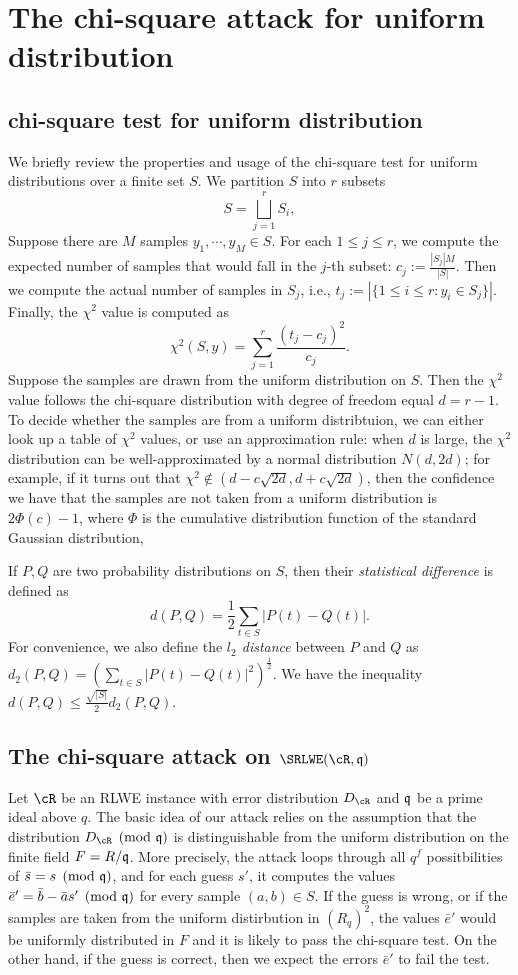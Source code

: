 \documentclass{amsart}
\begin{document}
\section{The chi-square attack for uniform distribution}
\label{sec: chi-square}
\subsection{chi-square test for uniform distribution}
We briefly review the properties and usage of the chi-square test for uniform distributions over a finite set $S$.  We partition $S$ into $r$ subsets
\[
    S = \bigsqcup_{j=1}^r S_i,
\]
Suppose there are $M$ samples $y_1, \cdots, y_M \in S$.
For each $1 \leq j \leq r$, we compute the expected number of samples that would fall in the $j$-th subset: $c_j := \frac{|S_j|M}{|S|}$. Then we compute the actual number of samples in $S_j$, i.e., $t_j := |\{1 \leq i \leq r: y_i \in S_j\}|$. Finally, the $\chi^2$ value is computed as
\[
    \chi^2(S,y) = \sum_{j = 1}^r \frac{(t_j -c_j)^2}{c_j}.
\]
Suppose the samples are drawn from the uniform distribution on $S$. Then the $\chi^2$ value follows the chi-square distribution with degree of freedom equal $d = r-1$.
To decide whether the samples are from a uniform distribtuion, we can either look up a table of $\chi^2$ values, or use an approximation rule:  when $d$ is large, the $\chi^2$ distribution can be well-approximated by a normal distribution $N(d, 2d)$; for example, if it turns out that $\chi^2 \notin (d - c \sqrt{2d}, d+ c \sqrt{2d})$, then the confidence we have that the samples are not taken from a uniform distribution is $2\Phi(c) - 1$, where $\Phi$ is the cumulative distribution function of the standard Gaussian distribution,

If $P,Q$ are two probability distributions on $S$, then their {\it statistical difference} is defined as
\[
    d(P,Q) = \frac{1}{2} \sum_{t \in S} |P(t) - Q(t)|.
\]
For convenience, we also define the {\it $l_2$ distance} between $P$ and $Q$ as $d_2(P,Q) = (\sum_{t \in S} |P(t) - Q(t)|^2)^{\frac{1}{2}}$. We have the inequality $d(P,Q) \leq \frac{\sqrt{|S|}}{2}d_2(P,Q)$.



\subsection{The chi-square attack on $\SRLWE(\cR,\fq)$}

Let $\cR$ be an RLWE instance with error distribution $D_{\cR}$ and $\mathfrak{q}$ be a prime ideal above $q$.  The basic idea of our attack relies on the assumption that the distribution $D_\cR \pmod {\fq}$ is distinguishable from the uniform distribution on the finite field $F = R/\mathfrak{q}$. More precisely, the attack loops through all $q^f$ possitbilities of $\bar{s} = s \pmod{\mathfrak{q}}$, and for each guess $s'$, it computes the values $\bar{e}' = \bar{b} - \bar{a} s' \pmod {\mathfrak{q}}$ for every sample $(a,b) \in S$. If the guess is wrong, or if the samples are taken from the uniform distirbution in $(R_q)^2$, the values $\bar{e}'$ would be uniformly distributed in $F$ and it is likely to pass the chi-square test. On the other hand, if the guess is correct, then we expect the errors $\bar{e}'$ to fail the test.
\end{document}
